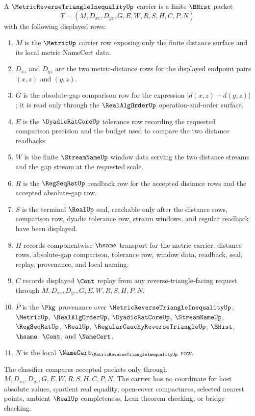 \begin{definition}
\label{def:metric-reverse-triangle-inequality-carrier}
A $\MetricReverseTriangleInequalityUp$ carrier is a finite $\BHist$ packet
$$
T=(M,D_{xz},D_{yz},G,E,W,R,S,H,C,P,N)
$$
with the following displayed rows:
\begin{enumerate}
\item $M$ is the $\MetricUp$ carrier row exposing only the finite distance surface and its local metric NameCert data.
\item $D_{xz}$ and $D_{yz}$ are the two metric-distance rows for the displayed endpoint pairs $(x,z)$ and $(y,z)$.
\item $G$ is the absolute-gap comparison row for the expression $|d(x,z)-d(y,z)|$; it is read only through the $\RealAlgOrderUp$ operation-and-order surface.
\item $E$ is the $\DyadicRatCoreUp$ tolerance row recording the requested comparison precision and the budget used to compare the two distance readbacks.
\item $W$ is the finite $\StreamNameUp$ window data serving the two distance streams and the gap stream at the requested scale.
\item $R$ is the $\RegSeqRatUp$ readback row for the accepted distance rows and the accepted absolute-gap row.
\item $S$ is the terminal $\RealUp$ seal, reachable only after the distance rows, comparison row, dyadic tolerance row, stream windows, and regular readback have been displayed.
\item $H$ records componentwise $\hsame$ transport for the metric carrier, distance rows, absolute-gap comparison, tolerance row, window data, readback, seal, replay, provenance, and local naming.
\item $C$ records displayed $\Cont$ replay from any reverse-triangle-facing request through $M,D_{xz},D_{yz},G,E,W,R,S,H,P,N$.
\item $P$ is the $\Pkg$ provenance over $\MetricReverseTriangleInequalityUp$, $\MetricUp$, $\RealAlgOrderUp$, $\DyadicRatCoreUp$, $\StreamNameUp$, $\RegSeqRatUp$, $\RealUp$, $\RegularCauchyReverseTriangleUp$, $\BHist$, $\hsame$, $\Cont$, and $\NameCert$.
\item $N$ is the local $\NameCert_{\MetricReverseTriangleInequalityUp}$ row.
\end{enumerate}
The classifier compares accepted packets only through $M,D_{xz},D_{yz},G,E,W,R,S,H,C,P,N$. The carrier has no coordinate for host absolute values, quotient real equality, open-cover compactness, selected nearest points, ambient $\RealUp$ completeness, Lean theorem checking, or bridge checking.
\end{definition}


